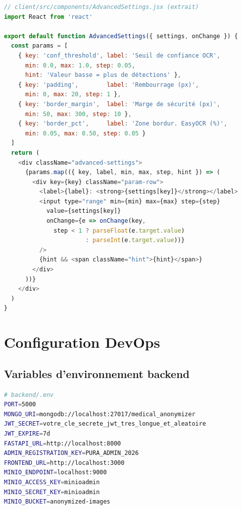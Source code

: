 \begin{lstlisting}[language=JavaScript, caption={Composant AdvancedSettings -- curseurs de paramétrage du pipeline}, label={lst:advsettings}]
// client/src/components/AdvancedSettings.jsx (extrait)
import React from 'react'

export default function AdvancedSettings({ settings, onChange }) {
  const params = [
    { key: 'conf_threshold', label: 'Seuil de confiance OCR',
      min: 0.0, max: 1.0, step: 0.05,
      hint: 'Valeur basse = plus de détections' },
    { key: 'padding',        label: 'Rembourrage (px)',
      min: 0, max: 20, step: 1 },
    { key: 'border_margin',  label: 'Marge de sécurité (px)',
      min: 50, max: 300, step: 10 },
    { key: 'border_pct',     label: 'Zone bordur. EasyOCR (%)',
      min: 0.05, max: 0.50, step: 0.05 }
  ]
  return (
    <div className="advanced-settings">
      {params.map(({ key, label, min, max, step, hint }) => (
        <div key={key} className="param-row">
          <label>{label}: <strong>{settings[key]}</strong></label>
          <input type="range" min={min} max={max} step={step}
            value={settings[key]}
            onChange={e => onChange(key,
              step < 1 ? parseFloat(e.target.value)
                       : parseInt(e.target.value))}
          />
          {hint && <span className="hint">{hint}</span>}
        </div>
      ))}
    </div>
  )
}
\end{lstlisting}

\section{Configuration DevOps}

\subsection{Variables d'environnement backend}

\begin{lstlisting}[language=bash, caption={Fichier .env du backend (valeurs d'exemple)}, label={lst:env}]
# backend/.env
PORT=5000
MONGO_URI=mongodb://localhost:27017/medical_anonymizer
JWT_SECRET=votre_cle_secrete_jwt_tres_longue_et_aleatoire
JWT_EXPIRE=7d
FASTAPI_URL=http://localhost:8000
ADMIN_REGISTRATION_KEY=PURA_ADMIN_2026
FRONTEND_URL=http://localhost:3000
MINIO_ENDPOINT=localhost:9000
MINIO_ACCESS_KEY=minioadmin
MINIO_SECRET_KEY=minioadmin
MINIO_BUCKET=anonymized-images
\end{lstlisting}

